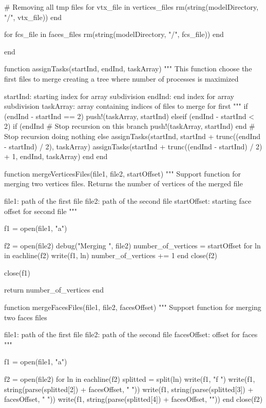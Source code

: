 \documentclass[11pt,oneside]{article}	%
\begin{document}
{  # Removing all tmp files
  for vtx_file in vertices_files
    rm(string(modelDirectory, "/", vtx_file))
  end

  for fcs_file in faces_files
    rm(string(modelDirectory, "/", fcs_file))
  end

end

function assignTasks(startInd, endInd, taskArray)
  """
  This function choose the first files to merge
  creating a tree where number of processes is maximized

  startInd: starting index for array subdivision
  endInd: end index for array subdivision
  taskArray: array containing indices of files to merge for first
  """
  if (endInd - startInd == 2)
    push!(taskArray, startInd)
  elseif (endInd - startInd < 2)
    if (endInd %
      # Stop recursion on this branch
      push!(taskArray, startInd)
    end
    # Stop recursion doing nothing
  else
    assignTasks(startInd, startInd + trunc((endInd - startInd) / 2), taskArray)
    assignTasks(startInd + trunc((endInd - startInd) / 2) + 1, endInd, taskArray)
  end
end

function mergeVerticesFiles(file1, file2, startOffset)
  """
  Support function for merging two vertices files.
  Returns the number of vertices of the merged file

  file1: path of the first file
  file2: path of the second file
  startOffset: starting face offset for second file
  """

  f1 = open(file1, "a")

  f2 = open(file2)
  debug("Merging ", file2)
  number_of_vertices = startOffset
  for ln in eachline(f2)
    write(f1, ln)
    number_of_vertices += 1
  end
  close(f2)

  close(f1)

  return number_of_vertices
end


function mergeFacesFiles(file1, file2, facesOffset)
  """
  Support function for merging two faces files

  file1: path of the first file
  file2: path of the second file
  facesOffset: offset for faces
  """

  f1 = open(file1, "a")

  f2 = open(file2)
  for ln in eachline(f2)
    splitted = split(ln)
    write(f1, "f ")
    write(f1, string(parse(splitted[2]) + facesOffset, " "))
    write(f1, string(parse(splitted[3]) + facesOffset, " "))
    write(f1, string(parse(splitted[4]) + facesOffset, "\n"))
  end
  close(f2)

}
\end{document}
